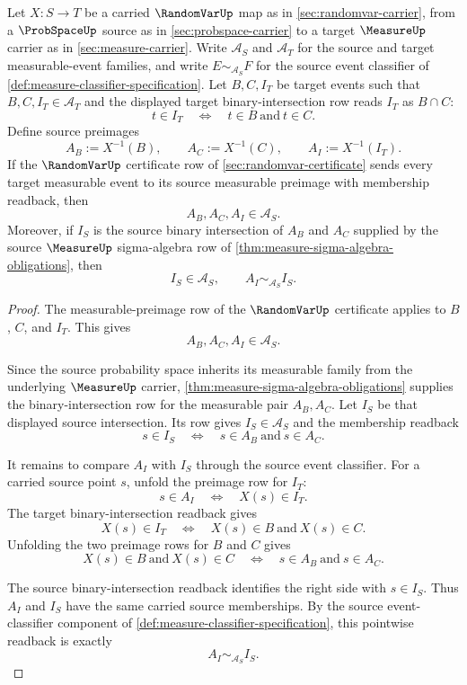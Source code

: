 \begin{theorem}
\label{thm:randomvar-preimage-binary-intersection-exactness}
Let $X:S\to T$ be a carried $\RandomVarUp$ map as in \autoref{sec:randomvar-carrier}, from a $\ProbSpaceUp$ source as in \autoref{sec:probspace-carrier} to a target $\MeasureUp$ carrier as in \autoref{sec:measure-carrier}. Write $\mathcal{A}_S$ and $\mathcal{A}_T$ for the source and target measurable-event families, and write $E\sim_{\mathcal{A}_S}F$ for the source event classifier of \autoref{def:measure-classifier-specification}. Let $B,C,I_T$ be target events such that $B,C,I_T\in\mathcal{A}_T$ and the displayed target binary-intersection row reads $I_T$ as $B\cap C$:
$$
t\in I_T\quad\Longleftrightarrow\quad t\in B\ \text{and}\ t\in C.
$$
Define source preimages
$$
A_B:=X^{-1}(B),
\qquad
A_C:=X^{-1}(C),
\qquad
A_I:=X^{-1}(I_T).
$$
If the $\RandomVarUp$ certificate row of \autoref{sec:randomvar-certificate} sends every target measurable event to its source measurable preimage with membership readback, then
$$
A_B,A_C,A_I\in\mathcal{A}_S.
$$
Moreover, if $I_S$ is the source binary intersection of $A_B$ and $A_C$ supplied by the source $\MeasureUp$ sigma-algebra row of \autoref{thm:measure-sigma-algebra-obligations}, then
$$
I_S\in\mathcal{A}_S,\qquad A_I\sim_{\mathcal{A}_S}I_S.
$$
\end{theorem}
\begin{proof}
The measurable-preimage row of the $\RandomVarUp$ certificate applies to $B$, $C$, and $I_T$. This gives
$$
A_B,A_C,A_I\in\mathcal{A}_S.
$$

Since the source probability space inherits its measurable family from the underlying $\MeasureUp$ carrier, \autoref{thm:measure-sigma-algebra-obligations} supplies the binary-intersection row for the measurable pair $A_B,A_C$. Let $I_S$ be that displayed source intersection. Its row gives $I_S\in\mathcal{A}_S$ and the membership readback
$$
s\in I_S\quad\Longleftrightarrow\quad s\in A_B\ \text{and}\ s\in A_C.
$$

It remains to compare $A_I$ with $I_S$ through the source event classifier. For a carried source point $s$, unfold the preimage row for $I_T$:
$$
s\in A_I\quad\Longleftrightarrow\quad X(s)\in I_T.
$$
The target binary-intersection readback gives
$$
X(s)\in I_T\quad\Longleftrightarrow\quad X(s)\in B\ \text{and}\ X(s)\in C.
$$
Unfolding the two preimage rows for $B$ and $C$ gives
$$
X(s)\in B\ \text{and}\ X(s)\in C
\quad\Longleftrightarrow\quad
s\in A_B\ \text{and}\ s\in A_C.
$$

The source binary-intersection readback identifies the right side with $s\in I_S$. Thus $A_I$ and $I_S$ have the same carried source memberships. By the source event-classifier component of \autoref{def:measure-classifier-specification}, this pointwise readback is exactly
$$
A_I\sim_{\mathcal{A}_S}I_S.
$$
\end{proof}

